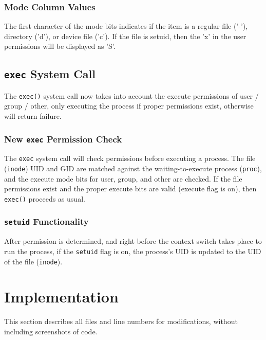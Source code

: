\documentclass[11pt,letterpaper]{report}
\begin{document}
	\subsubsection{Mode Column Values}
	The first character of the mode bits indicates if the item is a regular file ('-'), directory ('d'), or device file ('c'). If the file is setuid, then the 'x' in the user permissions will be displayed as 'S'.
	
	\subsection{{\tt exec} System Call}
	The {\tt exec()} system call now takes into account the execute permissions of user / group / other, only executing the process if proper permissions exist, otherwise will return failure.
	
	\subsubsection{New {\tt exec} Permission Check}
	The {\tt exec} system call will check permissions before executing a process. The file ({\tt inode}) UID and GID are matched against the waiting-to-execute process ({\tt proc}), and the execute mode bits for user, group, and other are checked. If the file permissions exist and the proper execute bits are valid (execute flag is on), then {\tt exec()} proceeds as usual.
	
	\subsubsection{{\tt setuid} Functionality}
	After permission is determined, and right before the context switch takes place to run the process, if the {\tt setuid} flag is on, the process's UID is updated to the UID of the file ({\tt inode}). 
	
		
	
	
	
	\newpage
	\section{Implementation}
	This section describes all files and line numbers for modifications, without including screenshots of code.
	
\end{document}
